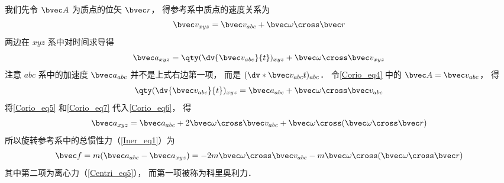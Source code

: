 我们先令 $\bvec A$ 为质点的位矢 $\bvec r$， 得参考系中质点的速度关系为
\begin{equation}\label{Corio_eq5}
\bvec v_{xyz} = \bvec v_{abc} + \bvec\omega\cross\bvec r
\end{equation}
两边在 $xyz$ 系中对时间求导得
\begin{equation}\label{Corio_eq6}
\bvec a_{xyz} = \qty(\dv{\bvec v_{abc}}{t})_{xyz} + \bvec\omega\cross\bvec v_{xyz}
\end{equation}
注意 $abc$ 系中的加速度 $\bvec a_{abc}$ 并不是上式右边第一项， 而是 $(\dv*{\bvec v_{abc}}{t})_{abc}$． 令\autoref{Corio_eq4} 中的 $\bvec A = \bvec v_{abc}$， 得
\begin{equation}\label{Corio_eq7}
\qty(\dv{\bvec v_{abc}}{t})_{xyz} = \bvec a_{abc} + \bvec\omega\cross\bvec v_{abc}
\end{equation}
将\autoref{Corio_eq5} 和\autoref{Corio_eq7} 代入\autoref{Corio_eq6}， 得
\begin{equation}
\bvec a_{xyz} = \bvec a_{abc} + 2\bvec\omega\cross\bvec v_{abc} + \bvec\omega\cross(\bvec\omega\cross\bvec r)
\end{equation}
所以旋转参考系中的总惯性力（\autoref{Iner_eq1}）为
\begin{equation}
\bvec f = m(\bvec a_{abc} - \bvec a_{xyz}) = -2m\bvec\omega\cross\bvec v_{abc} - m\bvec\omega\cross(\bvec\omega\cross\bvec r)
\end{equation}
其中第二项为离心力（\autoref{Centri_eq5}）， 而第一项被称为科里奥利力．
